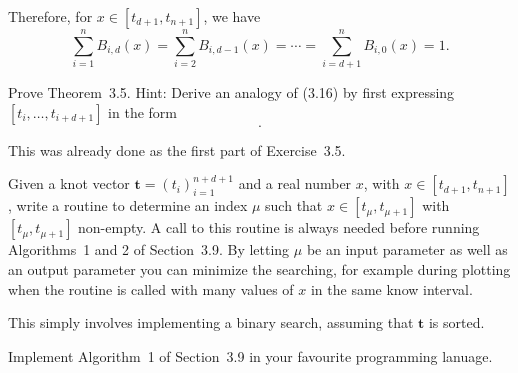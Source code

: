 \begin{solution}
    Therefore, for $x \in [t_{d+1}, t_{n+1}]$, we have
    \begin{equation*}
        \sum_{i = 1}^{n} B_{i, d}(x) = \sum_{i = 2}^{n} B_{i, d-1}(x) = \cdots = \sum_{i = d+1}^{n} B_{i, 0}(x) = 1.
    \end{equation*}
\end{solution}

\begin{exercise}
    Prove Theorem~3.5.
    Hint: Derive an analogy of (3.16) by first expressing $[t_i, \ldots, t_{i+d+1}]$ in the form
    \begin{equation*}
        [t_j, t_i, \ldots, \hat{t}_j, \ldots, t_{i+d+1}].
    \end{equation*}
\end{exercise}

\begin{solution}
    This was already done as the first part of Exercise~3.5.
\end{solution}

\begin{exercise}
    Given a knot vector $\mathbf{t} = (t_i)_{i=1}^{n+d+1}$ and a real number $x$, with $x \in [t_{d+1}, t_{n+1}]$, write a routine to determine an index $\mu$ such that $x \in [t_{\mu}, t_{\mu+1}]$ with $[t_{\mu}, t_{\mu+1}]$ non-empty.
    A call to this routine is always needed before running Algorithms~1 and 2 of Section~3.9.
    By letting $\mu$ be an input parameter as well as an output parameter you can minimize the searching, for example during plotting when the routine is called with many values of $x$ in the same know interval.
\end{exercise}

\begin{solution}
    This simply involves implementing a binary search, assuming that $\mathbf{t}$ is sorted.
\end{solution}

\begin{exercise}
    Implement Algorithm~1 of Section~3.9 in your favourite programming lanuage.
\end{exercise}